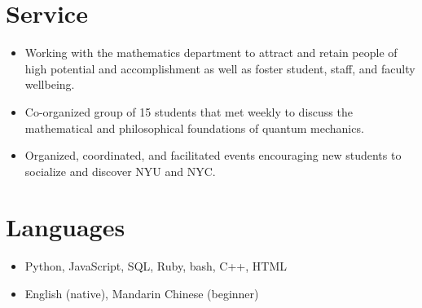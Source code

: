 \documentclass{cultvoucher}
\begin{document}
\section{Service}

\begin{itemize}
	\item Working with the mathematics department to attract and retain people of high potential and accomplishment as well as foster student, staff, and faculty wellbeing.
\end{itemize}

\begin{itemize}
	\item Co-organized group of 15 students that met weekly to discuss the mathematical and philosophical foundations of quantum mechanics.
\end{itemize}

\begin{itemize}
	\item Organized, coordinated, and facilitated events encouraging new students to socialize and discover NYU and NYC.
\end{itemize}

\section{Languages}
\begin{itemize}
	\item Python, JavaScript, SQL, Ruby, bash, C++, HTML
	\item English (native), Mandarin Chinese (beginner)
\end{itemize}
\end{document}
